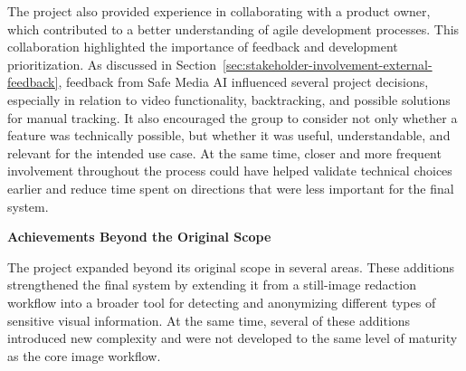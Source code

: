 The project also provided experience in collaborating with a product owner, which contributed to a better understanding of agile development processes. This collaboration highlighted the importance of feedback and development prioritization. As discussed in Section~\ref{sec:stakeholder-involvement-external-feedback}, feedback from Safe Media AI influenced several project decisions, especially in relation to video functionality, backtracking, and possible solutions for manual tracking. It also encouraged the group to consider not only whether a feature was technically possible, but whether it was useful, understandable, and relevant for the intended use case. At the same time, closer and more frequent involvement throughout the process could have helped validate technical choices earlier and reduce time spent on directions that were less important for the final system.

\noindent\textbf{Achievements Beyond the Original Scope}

The project expanded beyond its original scope in several areas. These additions strengthened the final system by extending it from a still-image redaction workflow into a broader tool for detecting and anonymizing different types of sensitive visual information. At the same time, several of these additions introduced new complexity and were not developed to the same level of maturity as the core image workflow.

